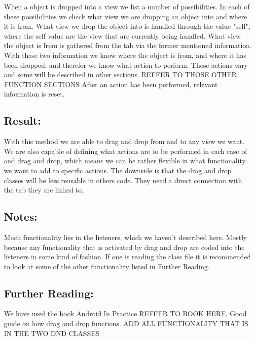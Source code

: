 
When a object is dropped into a view we list a number of possibilities. 
In each of these possibilities we check what view we are dropping an object into and where it is from. What view we drop the object into is handled through the value "self", where the self value are the view that are currently being handled. 
What view the object is from is gathered from the tab via the former mentioned information. 
With these two information we know where the object is from, and where it has been dropped, and therefor we know what action to perform. 
These actions vary and some will be described in other sections. REFFER TO THOSE OTHER FUNCTION SECTIONS 
After an action has been performed, relevant information is reset.

\subsection{Result:}
With this method we are able to drag and drop from and to any view we want. 
We are also capable of defining what actions are to be performed in each case of and drag and drop, which means we can be rather flexible in what functionality we want to add to specific actions. 
The downside is that the drag and drop classes will be less reusable in others code. 
They need a direct connection with the tab they are linked to.


\subsection{Notes:}
Much functionality lies in the listeners, which we haven't described here. Mostly because any functionality that is activated by drag and drop are coded into the listeners in some kind of fashion. If one is reading the class file it is recommended to look at some of the other functionality listed in Further Reading.


\subsection{Further Reading:}
We have used the book Android In Practice REFFER TO BOOK HERE. Good guide on how drag and drop functions.
ADD ALL FUNCTIONALITY THAT IS IN THE TWO DND CLASSES